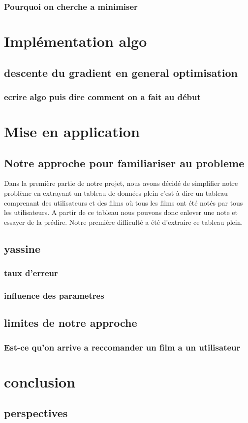 \documentclass[a4paper,10pt]{article}
\begin{document}
\subsubsection{Pourquoi on cherche a minimiser}
\section{Implémentation algo}
\subsection{descente du gradient en general optimisation}
\subsubsection{ecrire algo puis dire comment on a fait au début}
\section{Mise en application}
\subsection{Notre approche pour familiariser au probleme}
Dans la première partie de notre projet, nous avons décidé de simplifier notre problème en extrayant un tableau de données 
plein c'est à dire un tableau comprenant des utilisateurs et des films où tous les films ont été notés par tous les utilisateurs. 
A partir de ce tableau nous pouvons donc enlever une note et essayer de la prédire. 
Notre première difficulté a été d'extraire ce tableau plein.
\subsection{yassine}
\subsubsection{taux d'erreur}
\subsubsection{influence des parametres}
\subsection{limites de notre approche}
\subsubsection{Est-ce qu'on arrive a reccomander un film a un utilisateur}
\section{conclusion}

\subsection{perspectives}
\end{document}
